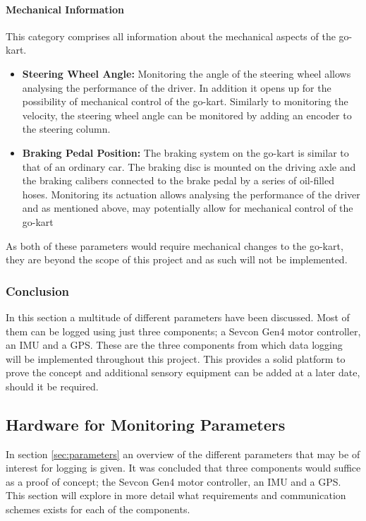 \paragraph*{Mechanical Information}
This category comprises all information about the mechanical aspects of the go-kart.
\begin{itemize}
	\item \textbf{Steering Wheel Angle:} Monitoring the angle of the steering wheel allows analysing the performance of the driver.
	In addition it opens up for the possibility of mechanical control of the go-kart.
	Similarly to monitoring the velocity, the steering wheel angle can be monitored by adding an encoder to the steering column.
	\item \textbf{Braking Pedal Position:} The braking system on the go-kart is similar to that of an ordinary car.
	The braking disc is mounted on the driving axle and the braking calibers connected to the brake pedal by a series of oil-filled hoses.
	Monitoring its actuation allows analysing the performance of the driver and as mentioned above, may potentially allow for mechanical control of the go-kart
\end{itemize}
As both of these parameters would require mechanical changes to the go-kart, they are beyond the scope of this project and as such will not be implemented.
\subsubsection*{Conclusion}
In this section a multitude of different parameters have been discussed.
Most of them can be logged using just three components; a Sevcon Gen4 motor controller, an IMU and a GPS.
These are the three components from which data logging will be implemented throughout this project.
This provides a solid platform to prove the concept and additional sensory equipment can be added at a later date, should it be required.


























\subsection{Hardware for Monitoring Parameters}
\label{sec:hardware_for_par}
In section \ref{sec:parameters} an overview of the different parameters that may be of interest for logging is given.
It was concluded that three components would suffice as a proof of concept; the Sevcon Gen4 motor controller, an IMU and a GPS.
This section will explore in more detail what requirements and communication schemes exists for each of the components.

